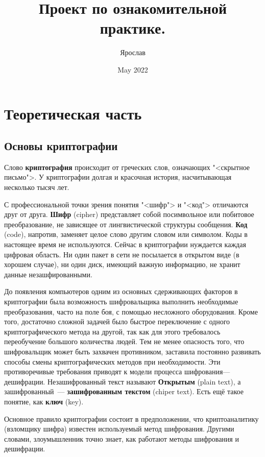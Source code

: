 \documentclass[oneside,final,14pt]{extreport}
\title{Проект по ознакомительной практике.}
\author{Ярослав}
\date{May 2022}
\begin{document}
\maketitle

\chapter{Теоретическая часть}

	\section{Основы криптографии}

	Слово \textbf{криптография} происходит от греческих слов, означающих "<скрытное письмо">.
	У криптографии долгая и красочная история, насчитывающая несколько тысяч лет.
	
	С профессиональной точки зрения понятия "<шифр"> и "<код"> отличаются друг от друга. \textbf{Шифр} (cipher) представляет собой посимвольное или побитовое преобразование, не зависящее от лингвистической структуры сообщения. \textbf{Код} (code), напротив, заменяет целое слово другим словом или символом. 
	Коды в настоящее время не используются.
	Сейчас в криптографии нуждается каждая цифровая область. 
	Ни один пакет в сети не посылается в открытом виде (в хорошем случае), ни один диск, имеющий важную информацию, не хранит данные незашфированными.

	До появления компьютеров одним из основных сдерживающих факторов в криптографии была возможность шифровальщика выполнить необходимые преобразования, часто на поле боя, с помощью несложного оборудования.
	Кроме того, достаточно сложной задачей было быстрое переключение с одного криптографического метода на другой, так как для этого требовалось переобучение большого количества людей.
	Тем не менее опасность того, что шифровальщик может быть захвачен противником, заставила постоянно развивать способы смены криптографических методов при необходимости.
	Эти противоречивые требования приводят к модели процесса шифрования—дешифрации.
	Незашифрованный текст называют \textbf{Открытым} (plain text), а зашифрованный~--- \textbf{зашифрованным текстом} (chiper text). Есть ещё такое понятие, как \textbf{ключ} (key).

	Основное правило криптографии состоит в предположении, что криптоаналитику (взломщику шифра) известен используемый метод шифрования. Другими словами, злоумышленник точно знает, как работают методы шифрования и дешифрации.
\end{document}
